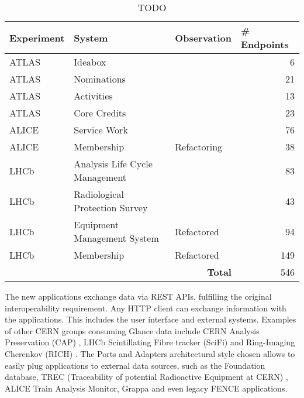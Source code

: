 \begin{table}[htbp]
\begin{tabular}{ll|l|r|}
\hline
\multicolumn{1}{|l|}{Experiment} & System & Observation & \multicolumn{1}{l|}{\# Endpoints} \\
\hline
\multicolumn{1}{|l|}{ATLAS}      & Ideabox \cite{oliveira-tcc}    &             & 6   \\ 
\multicolumn{1}{|l|}{ATLAS}      & Nominations \cite{oliveira-tcc} &             & 21  \\ 
\multicolumn{1}{|l|}{ATLAS}      & Activities                     &             & 13  \\ 
\multicolumn{1}{|l|}{ATLAS}      & Core Credits \cite{pires-tcc}  &             & 23  \\ 
\multicolumn{1}{|l|}{ALICE}      & Service Work                   &             & 76  \\ 
\multicolumn{1}{|l|}{ALICE}      & Membership                     & Refactoring & 38  \\ 
\multicolumn{1}{|l|}{LHCb}       & Analysis Life Cycle Management &             & 83  \\ 
\multicolumn{1}{|l|}{LHCb}       & Radiological Protection Survey &             & 43  \\ 
\multicolumn{1}{|l|}{LHCb}       & Equipment Management System \cite{de-jesus-tcc} & Refactored  & 94  \\ 
\multicolumn{1}{|l|}{LHCb}       & Membership                     & Refactored  & 149 \\
\hline
                                 &                                & \multicolumn{1}{r|}{\textbf{Total}} & 546 \\
\cline{3-4} 
\end{tabular}
\caption{TODO}
\label{table:new-apps}
\end{table}

The new applications exchange data via REST APIs, fulfilling the original interoperability requirement. Any HTTP client can exchange information with the applications. This includes the user interface and external systems. Examples of other CERN groups consuming Glance data include CERN Analysis Preservation (CAP) \cite{cap-website}, LHCb Scintillating Fibre tracker (SciFi) \cite{lhcb-scifi} and Ring-Imaging Cherenkov (RICH) \cite{lhcb-rich}. The Ports and Adapters architectural style chosen allows to easily plug applications to external data sources, such as the Foundation database, TREC (Traceability of potential Radioactive Equipment at CERN) \cite{eam-trec-website}, ALICE Train Analysis Monitor, Grappa \cite{grappa-website} and even legacy FENCE applications.

